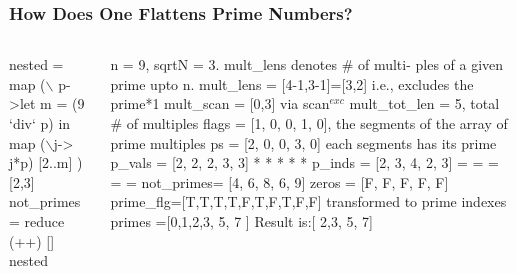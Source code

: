 \documentclass{beamer}
\renewcommand{\emph}[1]{\textcolor{structure}{#1}}
\newcommand{\emp}[1]{\textcolor{DikuRed}{ #1}}
\newcommand{\mymath}[1]{$ #1 $}
\newcommand{\myindu}[1]{^{#1}}
\begin{document}
\begin{frame}[fragile,t]
  \frametitle{How Does One Flattens Prime Numbers?}

\begin{columns}
\begin{colorcode}[fontsize=\scriptsize]
nested = \emp{map} (\mymath{\backslash}\emp{p}->let m = (9 `div` p) 
                  in  \emp{map} (\mymath{\backslash}j-> j*p)
                          [2..m]
             ) \emp{[2,3]}
not_primes  = \emph{reduce} (++) [] nested
\end{colorcode}
\begin{colorcode}[fontsize=\scriptsize]
n = 9, sqrtN = 3.
mult_lens denotes \# of multi-
  ples of a given prime upto n.
mult_lens = [4-1,3-1]=[3,2] i.e., 
            excludes the prime*1
mult_scan = [0,3] via scan\mymath{\myindu{exc}} 
mult_tot_len = 5, total \# of multiples 
flags     = [1, 0, 0, 1, 0],
  the segments of the array
        of prime multiples
ps        = [2, 0, 0, 3, 0]
  each segments has its prime
p_vals    = [2, 2, 2, 3, 3]
             *  *  *  *  *
p_inds    = [2, 3, 4, 2, 3]
             =  =  =  =  =
not_primes= [4, 6, 8, 6, 9]
zeros    = [F, F, F, F, F]
prime_flg=[T,T,T,T,F,T,F,T,F,F]
  transformed to prime indexes
primes   =[0,1,2,3,  5,  7    ]
\alert{Result is:[    2,3,  5,  7]}
\end{colorcode}
\end{columns}

\end{frame}
\end{document}
